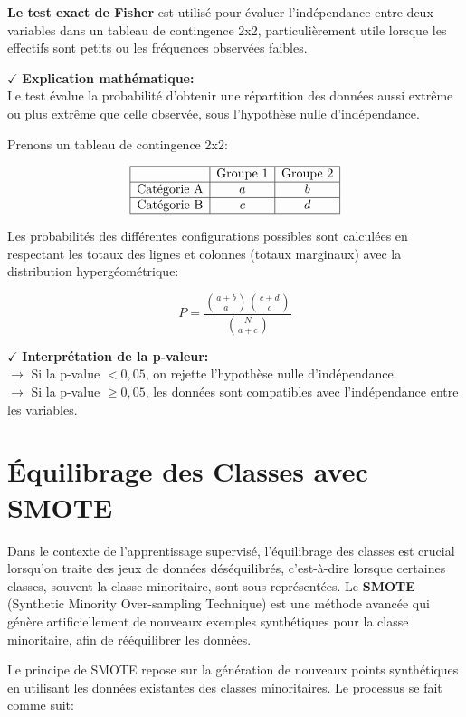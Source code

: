 \textbf{Le test exact de Fisher} est utilisé pour évaluer l'indépendance entre deux variables dans un tableau de contingence 2x2, particulièrement utile lorsque les effectifs sont petits ou les fréquences observées faibles.

\textbf{\(\checkmark\)} \textbf{Explication mathématique:}\\
Le test évalue la probabilité d'obtenir une répartition des données aussi extrême ou plus extrême que celle observée, sous l'hypothèse nulle d'indépendance.

Prenons un tableau de contingence 2x2:

\[
\begin{array}{|c|c|c|}
\hline
 & \text{Groupe 1} & \text{Groupe 2} \\
\hline
\text{Catégorie A} & a & b \\
\hline
\text{Catégorie B} & c & d \\
\hline
\end{array}
\]

Les probabilités des différentes configurations possibles sont calculées en respectant les totaux des lignes et colonnes (totaux marginaux) avec la distribution hypergéométrique:

\[
P = \frac{\binom{a+b}{a} \binom{c+d}{c}}{\binom{N}{a+c}}
\]

\textbf{\(\checkmark\)} \textbf{Interprétation de la p-valeur:}\\
\textbf{\(\rightarrow\)} Si la p-value \( < 0{,}05 \), on rejette l'hypothèse nulle d'indépendance.\\
\textbf{\(\rightarrow\)} Si la p-value \( \geq 0{,}05 \), les données sont compatibles avec l'indépendance entre les variables.

\section{Équilibrage des Classes avec SMOTE}

Dans le contexte de l'apprentissage supervisé, l'équilibrage des classes est crucial lorsqu'on traite des jeux de données déséquilibrés, c'est-à-dire lorsque certaines classes, souvent la classe minoritaire, sont sous-représentées. Le \textbf{SMOTE} (Synthetic Minority Over-sampling Technique) est une méthode avancée qui génère artificiellement de nouveaux exemples synthétiques pour la classe minoritaire, afin de rééquilibrer les données.

Le principe de SMOTE repose sur la génération de nouveaux points synthétiques en utilisant les données existantes des classes minoritaires. Le processus se fait comme suit:

